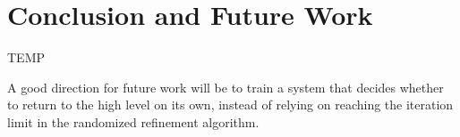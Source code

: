\section{Conclusion and Future Work}
TEMP

A good direction for future work will be to train a system that decides
whether to return to the high level on its own, instead of relying on
reaching the iteration limit in the randomized refinement algorithm.